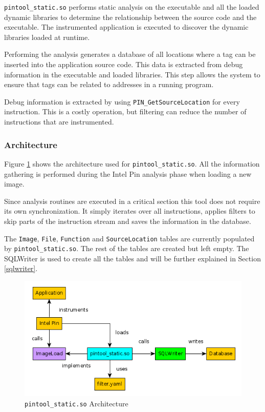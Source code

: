 \texttt{pintool\_static.so} performs static analysis on the executable and all the loaded dynamic libraries to determine the relationship between the source code and the executable. The instrumented application is executed to discover the dynamic libraries loaded at runtime.

Performing the analysis generates a database of all locations where a tag can be inserted into the application source code. This data is extracted from debug information in the executable and loaded libraries. This step allows the system to ensure that tags can be related to addresses in a running program.

Debug information is extracted by using \texttt{PIN\_GetSourceLocation} \cite{pindoc} for every instruction. This is a costly operation, but filtering can reduce the number of instructions that are instrumented.

\subsubsection{Architecture}

Figure \ref{cap3:static-arch} shows the architecture used for \texttt{pintool\_static.so}. All the information gathering is performed during the Intel Pin analysis phase when loading a new image.

Since analysis routines are executed in a critical section \cite{pindoc} this tool does not require its own synchronization. It simply iterates over all instructions, applies filters to skip parts of the instruction stream and saves the information in the database.

The \texttt{Image}, \texttt{File}, \texttt{Function} and \texttt{SourceLocation} tables are currently populated by \texttt{pintool\_static.so}. The rest of the tables are created but left empty. The SQLWriter is used to create all the tables and will be further explained in Section \ref{sqlwriter}.

\begin{figure}
	\centering
	\includegraphics[width=1\textwidth]{static-arch}
	\caption{\texttt{pintool\_static.so} Architecture}
	\label{cap3:static-arch}
\end{figure}

